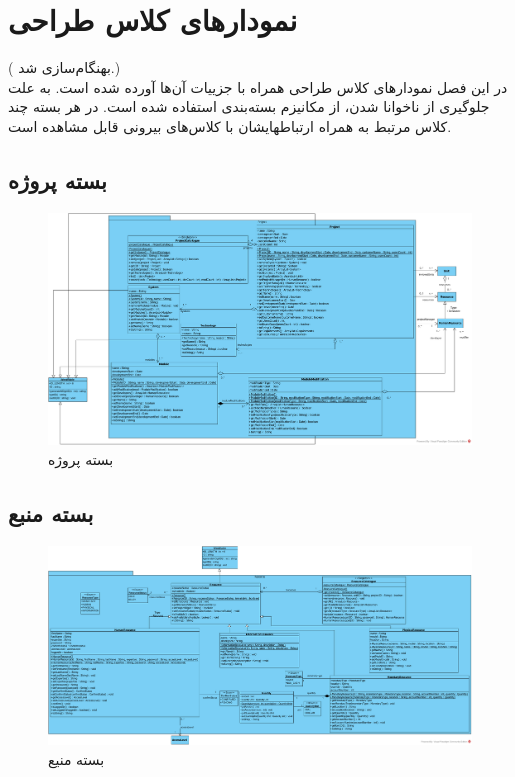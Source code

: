 \chapter{نمودارهای کلاس طراحی}
({\color{red} بهنگام‌سازی شد.}) \\
در این فصل نمودارهای کلاس طراحی همراه با جزییات آن‌ها آورده شده است. به علت جلوگیری از ناخوانا شدن، از مکانیزم بسته‌بندی
استفاده شده است. در هر بسته چند کلاس مرتبط به همراه ارتباطهایشان با کلاس‌های بیرونی قابل مشاهده است.
\begin{landscape}
\section{بسته پروژه}
\begin{figure}[H]
	\centering
	\includegraphics[scale=0.4]{img/class-design/ProjectPackage}
	\caption{بسته پروژه}
\end{figure}



\section{بسته منبع}
\begin{figure}[H]
	\centering
	\includegraphics[scale=0.45]{img/class-design/ResourcePackage}
	\caption{بسته منیع}
\end{figure}



\end{landscape}
